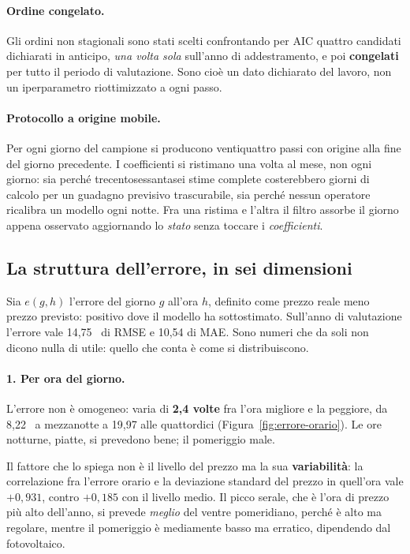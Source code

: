 \paragraph{Ordine congelato.} Gli ordini non stagionali sono stati scelti confrontando per
\ac{AIC} quattro candidati dichiarati in anticipo, \emph{una volta sola} sull'anno di
addestramento, e poi \textbf{congelati} per tutto il periodo di valutazione. Sono cio\`e un
dato dichiarato del lavoro, non un iperparametro riottimizzato a ogni passo.

\paragraph{Protocollo a origine mobile.} Per ogni giorno del campione si producono
ventiquattro passi con origine alla fine del giorno precedente. I coefficienti si ristimano
una volta al mese, non ogni giorno: sia perch\'e trecentosessantasei stime complete
costerebbero giorni di calcolo per un guadagno previsivo trascurabile, sia perch\'e nessun
operatore ricalibra un modello ogni notte. Fra una ristima e l'altra il filtro assorbe il
giorno appena osservato aggiornando lo \emph{stato} senza toccare i \emph{coefficienti}.

\subsection{La struttura dell'errore, in sei dimensioni}
\label{sec:errore}

Sia $e(g,h)$ l'errore del giorno $g$ all'ora $h$, definito come prezzo reale meno prezzo
previsto: positivo dove il modello ha sottostimato. Sull'anno di valutazione l'errore vale
14,75~\euromwh{} di \ac{RMSE} e 10,54 di \ac{MAE}. Sono numeri che da soli
non dicono nulla di utile: quello che conta \`e come si distribuiscono.

\paragraph{1. Per ora del giorno.} L'errore non \`e omogeneo: varia di \textbf{2,4 volte} fra
l'ora migliore e la peggiore, da 8,22~\euromwh{} a mezzanotte a 19,97 alle
quattordici (Figura~\ref{fig:errore-orario}). Le ore notturne, piatte, si prevedono bene; il
pomeriggio male.

Il fattore che lo spiega non \`e il livello del prezzo ma la sua \textbf{variabilit\`a}: la
correlazione fra l'errore orario e la deviazione standard del prezzo in quell'ora vale
$+0{,}931$, contro $+0{,}185$ con il livello medio. Il picco serale, che \`e l'ora di prezzo
pi\`u alto dell'anno, si prevede \emph{meglio} del ventre pomeridiano, perch\'e \`e alto ma
regolare, mentre il pomeriggio \`e mediamente basso ma erratico, dipendendo dal fotovoltaico.

